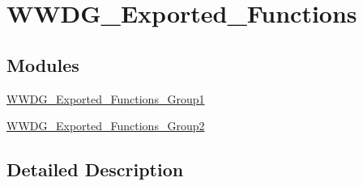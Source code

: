 \hypertarget{group___w_w_d_g___exported___functions}{}\section{W\+W\+D\+G\+\_\+\+Exported\+\_\+\+Functions}
\label{group___w_w_d_g___exported___functions}
\subsection*{Modules}
\begin{DoxyCompactItemize}
\item 
\hyperlink{group___w_w_d_g___exported___functions___group1}{W\+W\+D\+G\+\_\+\+Exported\+\_\+\+Functions\+\_\+\+Group1}
\item 
\hyperlink{group___w_w_d_g___exported___functions___group2}{W\+W\+D\+G\+\_\+\+Exported\+\_\+\+Functions\+\_\+\+Group2}
\end{DoxyCompactItemize}


\subsection{Detailed Description}
